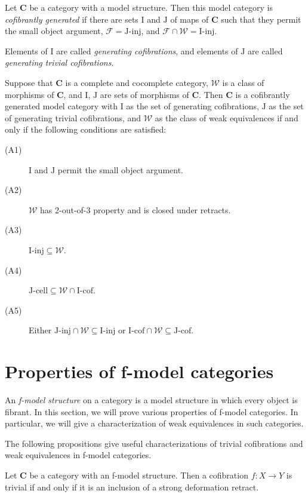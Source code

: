 \documentclass{amsart}
\theoremstyle{definition}
\newcommand{\we}{\mathcal{W}}
\newcommand{\fib}{\mathcal{F}}
\newcommand{\cat}[1]{\mathbf{#1}}
\newcommand{\C}{\cat{C}}
\newcommand{\I}{\mathrm{I}}
\newcommand{\J}{\mathrm{J}}
\newcommand{\class}[2]{#1\text{-}\mathrm{#2}}
\newcommand{\Iinj}[1][\I]{\class{#1}{inj}}
\newcommand{\Icell}[1][\I]{\class{#1}{cell}}
\newcommand{\Icof}[1][\I]{\class{#1}{cof}}
\newcommand{\Jinj}[1][]{\Iinj[\J#1]}
\newcommand{\Jcell}[1][]{\Icell[\J#1]}
\newcommand{\Jcof}[1][]{\Icof[\J#1]}
\begin{document}
\begin{defn}
Let $\C$ be a category with a model structure. Then this model category is
\emph{cofibrantly generated} if there are sets $\I$ and $\J$ of maps of $\C$ such
that they permit the small object argument, $\fib = \Jinj$, and $\fib \cap \we = \Iinj$.

Elements of $\I$ are called \emph{generating cofibrations},
and elements of $\J$ are called \emph{generating trivial cofibrations}.
\end{defn}

\begin{prop}
Suppose that $\C$ is a complete and cocomplete category, $\we$ is a class of morphisms of $\C$, and $\I$, $\J$ are sets of morphisms of $\C$.
Then $\C$ is a cofibrantly generated model category with $\I$ as the set of generating cofibrations,
$\J$ as the set of generating trivial cofibrations, and $\we$ as the class of weak equivalences if and only if the following conditions are satisfied:
\begin{description}
\item[(A1)] $\I$ and $\J$ permit the small object argument.
\item[(A2)] $\we$ has 2-out-of-3 property and is closed under retracts.
\item[(A3)] $\Iinj \subseteq \we$.
\item[(A4)] $\Jcell \subseteq \we \cap \Icof$.
\item[(A5)] Either $\Jinj \cap \we \subseteq \Iinj$ or $\Icof \cap \we \subseteq \Jcof$.
\end{description}
\end{prop}

\section{Properties of f-model categories}

An \emph{f-model structure} on a category is a model structure in which every object is fibrant.
In this section, we will prove various properties of f-model categories.
In particular, we will give a characterization of weak equivalences in such categories.

The following propositions give useful characterizations of trivial
cofibrations and weak equivalences in f-model categories.

\begin{prop}
Let $\C$ be a category with an f-model structure.
Then a cofibration $f : X \to Y$ is trivial if and only if it is an inclusion of a strong deformation retract.
\end{prop}
\end{document}
